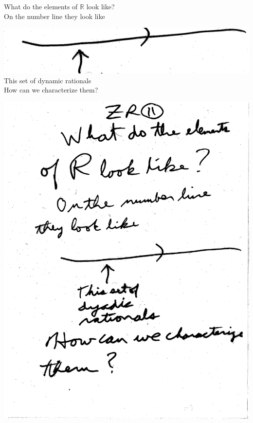 \documentclass[10pt,a4paper]{article}
\begin{document}

What do the elements of $\mathbb{R}$ look like? 
\\On the number line they look like

\includegraphics[scale=.5]{Pages/ZR_11_im1}
\\This set of dynamic rationals
\\How can we characterize them?

\includegraphics[scale=.5]{Pages/ZR_11}

\newpage
\end{document}
